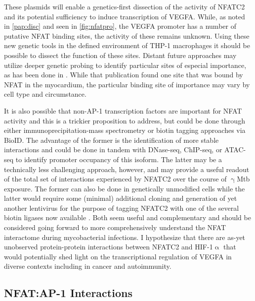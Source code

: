 \doublespacing

These plasmids will enable a genetics-first dissection of the activity of NFATC2 and its potential sufficiency to induce transcription of VEGFA. While, as noted in \autoref{pap:disc} and seen in \autoref{fig:nfatpro}, the VEGFA promoter has a number of putative NFAT binding sites, the activity of these remains unknown. Using these new genetic tools in the defined environment of THP-1 macrophages it should be possible to dissect the function of these sites. Distant future approaches may utilize deeper genetic probing to identify particular sites of especial importance, as has been done in \citet{Chang2004}. While that publication found one site that was bound by NFAT in the myocardium, the particular binding site of importance may vary by cell type and circumstance. 

It is also possible that non-AP-1 transcription factors are important for NFAT activity and this is a trickier proposition to address, but could be done through either immunoprecipitation-mass spectrometry or biotin tagging approaches via BioID. The advantage of the former is the identification of more stable interactions and could be done in tandem with DNase-seq, ChIP-seq, or ATAC-seq to identify promoter occupancy of this isoform. The latter may be a technically less challenging approach, however, and may provide a useful readout of the total set of interactions experienced by NFATC2 over the course of $\upgamma$Mtb exposure. The former can also be done in genetically unmodified cells while the latter would require some (minimal) additional cloning and generation of yet another lentivirus for the purpose of tagging NFATC2 with one of the several biotin ligases now available \citep{Cho2020}. Both seem useful and complementary and should be considered going forward to more comprehensively understand the NFAT interactome during mycobacterial infections. I hypothesize that there are as-yet unobserved protein-protein interactions between NFATC2 and HIF-1$\upalpha$ that would potentially shed light on the transcriptional regulation of VEGFA in diverse contexts including in cancer and autoimmunity. 

\subsection{NFAT:AP-1 Interactions}

